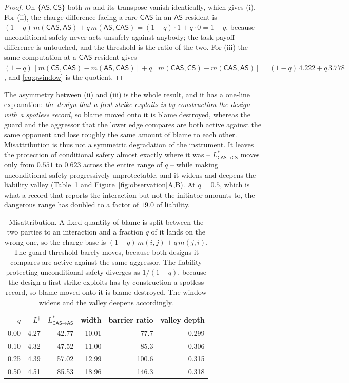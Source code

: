 \documentclass[pdflatex]{sn-jnl}
\theoremstyle{thmstyleone}
\theoremstyle{thmstylethree}
\theoremstyle{thmstyletwo}
\newcommand{\AS}{\textsf{AS}}
\newcommand{\CS}{\textsf{CS}}
\newcommand{\CAS}{\textsf{CAS}}
\begin{document}
\begin{proof}
On $\{\AS,\CS\}$ both $m$ and its transpose vanish identically, which gives
(i). For (ii), the charge difference facing a rare $\CAS$ in an $\AS$ resident
is $(1-q)\,m(\CAS,\AS)+q\,m(\AS,\CAS)=(1-q)\cdot1+q\cdot0=1-q$, because
unconditional safety never acts unsafely against anybody; the task-payoff
difference is untouched, and the threshold is the ratio of the two. For (iii)
the same computation at a $\CAS$ resident gives
$(1-q)\,[m(\CS,\CAS)-m(\AS,\CAS)]+q\,[m(\CAS,\CS)-m(\CAS,\AS)]
 =(1-q)\,4.222+q\,3.778$, and \eqref{eq:qwindow} is the quotient.
\end{proof}

The asymmetry between (ii) and (iii) is the whole result, and it has a
one-line explanation: \emph{the design that a first strike exploits is by
construction the design with a spotless record}, so blame moved onto it is
blame destroyed, whereas the guard and the aggressor that the lower edge
compares are both active against the same opponent and lose roughly the same
amount of blame to each other. Misattribution is thus not a symmetric
degradation of the instrument. It leaves the protection of conditional safety
almost exactly where it was -- $L^{*}_{\CAS\to\CS}$ moves only from $0.551$ to
$0.623$ across the entire range of $q$ -- while making unconditional safety
progressively unprotectable, and it widens and deepens the liability valley
(Table~\ref{tab:attribution} and Figure~\ref{fig:observation}A,B). At $q=0.5$,
which is what a record that reports the interaction but not the initiator
amounts to, the dangerous range has doubled to a factor of $19.0$ of
liability.

\begin{table}[!ht]
\centering
\caption{Misattribution. A fixed quantity of blame is split between the two parties to an interaction and a fraction $q$ of it lands on the wrong one, so the charge base is $(1-q)\,m(i,j)+q\,m(j,i)$. The guard threshold barely moves, because both designs it compares are active against the same aggressor. The liability protecting unconditional safety diverges as $1/(1-q)$, because the design a first strike exploits has by construction a spotless record, so blame moved onto it is blame destroyed. The window widens and the valley deepens accordingly.}
\label{tab:attribution}
\begin{tabular}{rrrrrr}
\toprule
$q$ & $L^{\dagger}$ & $L^{*}_{\CAS\to\AS}$ & width & barrier ratio & valley depth \\
\midrule
0.00 & 4.27 & 42.77 & 10.01 & 77.7 & 0.299 \\
0.10 & 4.32 & 47.52 & 11.00 & 85.3 & 0.306 \\
0.25 & 4.39 & 57.02 & 12.99 & 100.6 & 0.315 \\
0.50 & 4.51 & 85.53 & 18.96 & 146.3 & 0.318 \\
\bottomrule
\end{tabular}
\end{table}
\end{document}
